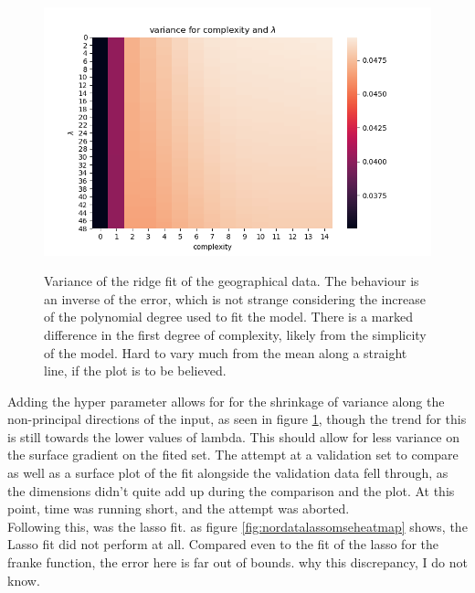 \documentclass[ 12pt, a4paper ]{article}
\begin{document}
\begin{figure}[H]
\includegraphics[scale=0.7]{nordataridgevarianceheatmap.png}
\label{fig:nordataridgevarianceheatmap}
\caption{
    Variance of the ridge fit of the geographical data. The behaviour is an inverse of the error,
    which is not strange considering the increase of the polynomial degree used to fit the model.
    There is a marked difference in the first degree of complexity, likely from the simplicity
    of the model. Hard to vary much from the mean along a straight line, if the plot is to be 
    believed. 
}
\end{figure}

Adding the hyper parameter allows for for the shrinkage of variance along the non-principal 
directions of the input, as seen in figure \ref{fig:nordataridgevarianceheatmap}, though the trend
for this is still towards the lower values of lambda. This should allow for less variance on the 
surface gradient on the fited set. The attempt at a validation set to compare as well as a 
surface plot of the fit alongside the validation data fell through, as the dimensions didn't 
quite add up during the comparison and the plot. At this point, time was running short, and the
attempt was aborted. \\

Following this, was the lasso fit. as figure \ref{fig:nordatalassomseheatmap} shows, the Lasso 
fit did not perform at all. Compared even to the fit of the lasso for the franke function, the 
error here is far out of bounds. why this discrepancy, I do not know. 
\end{document}
